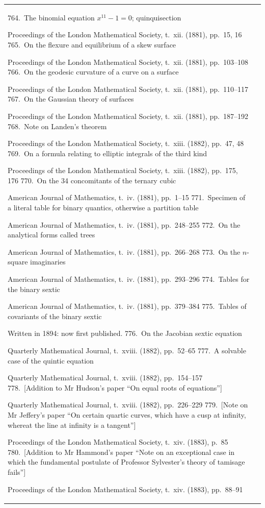 \documentclass[11pt,a4paper]{book}
\providecommand{\paperentry}[3]{#1.\ #2\dotfill #3\par}
\begin{document}
\begin{center}
\begin{tabular}{p{4.2in}r}
\paperentry{764}{The binomial equation $x^{11} - 1 = 0$; quinquisection}{314}{Proceedings of the London Mathematical Society, t.~xii. (1881), pp.~15, 16}
\paperentry{765}{On the flexure and equilibrium of a skew surface}{317}{Proceedings of the London Mathematical Society, t.~xii. (1881), pp.~103--108}
\paperentry{766}{On the geodesic curvature of a curve on a surface}{323}{Proceedings of the London Mathematical Society, t.~xii. (1881), pp.~110--117}
\paperentry{767}{On the Gaussian theory of surfaces}{331}{Proceedings of the London Mathematical Society, t.~xii. (1881), pp.~187--192}
\paperentry{768}{Note on Landen's theorem}{337}{Proceedings of the London Mathematical Society, t.~xiii. (1882), pp.~47, 48}
\paperentry{769}{On a formula relating to elliptic integrals of the third kind}{340}{Proceedings of the London Mathematical Society, t.~xiii. (1882), pp.~175, 176}
\paperentry{770}{On the 34 concomitants of the ternary cubic}{342}{American Journal of Mathematics, t.~iv. (1881), pp.~1--15}
\paperentry{771}{Specimen of a literal table for binary quantics, otherwise a partition table}{357}{American Journal of Mathematics, t.~iv. (1881), pp.~248--255}
\paperentry{772}{On the analytical forms called trees}{365}{American Journal of Mathematics, t.~iv. (1881), pp.~266--268}
\paperentry{773}{On the $n$-square imaginaries}{368}{American Journal of Mathematics, t.~iv. (1881), pp.~293--296}
\paperentry{774}{Tables for the binary sextic}{372}{American Journal of Mathematics, t.~iv. (1881), pp.~379--384}
\paperentry{775}{Tables of covariants of the binary sextic}{377}{Written in 1894: now first published.}
\paperentry{776}{On the Jacobian sextic equation}{389}{Quarterly Mathematical Journal, t.~xviii. (1882), pp.~52--65}
\paperentry{777}{A solvable case of the quintic equation}{402}{Quarterly Mathematical Journal, t.~xviii. (1882), pp.~154--157}
\paperentry{778}{[Addition to Mr Hudson's paper ``On equal roots of equations'']}{405}{Quarterly Mathematical Journal, t.~xviii. (1882), pp.~226--229}
\paperentry{779}{[Note on Mr Jeffery's paper ``On certain quartic curves, which have a cusp at infinity, whereat the line at infinity is a tangent'']}{408}{Proceedings of the London Mathematical Society, t.~xiv. (1883), p.~85}
\paperentry{780}{[Addition to Mr Hammond's paper ``Note on an exceptional case in which the fundamental postulate of Professor Sylvester's theory of tamisage fails'']}{409}{Proceedings of the London Mathematical Society, t.~xiv. (1883), pp.~88--91}
\end{tabular}
\end{center}
\end{document}
